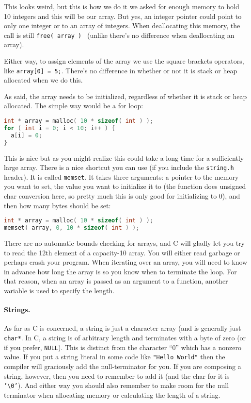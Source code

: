 This looks weird, but this is how we do it we asked for enough memory to hold 10 integers and this will be our array. But yes, an integer pointer could point to only one integer or to an array of integers. When deallocating this memory, the call is still \texttt{free( array ) } (unlike \Cpp there's no difference when deallocating an array).

Either way, to assign elements of the array we use the square brackets operators, like \texttt{array[0] = 5;}. There's no difference in whether or not it is stack or heap allocated when we do this.

As said, the array needs to be initialized, regardless of whether it is stack or heap allocated. The simple way would be a for loop:

\begin{lstlisting}[language=C]
int * array = malloc( 10 * sizeof( int ) );
for ( int i = 0; i < 10; i++ ) {
  a[i] = 0;
}
\end{lstlisting}

This is nice but as you might realize this could take a long time for a sufficiently large array. There is a nice shortcut you can use (if you include the \texttt{string.h} header). It is called \texttt{memset}. It takes three arguments: a pointer to the memory you want to set, the value you want to initialize it to (the function does unsigned char conversion here, so pretty much this is only good for initializing to 0), and then how many bytes should be set:

\begin{lstlisting}[language=C]
int * array = malloc( 10 * sizeof( int ) );
memset( array, 0, 10 * sizeof( int ) );
\end{lstlisting}

There are no automatic bounds checking for arrays, and C will gladly let you try to read the 12th element of a capacity-10 array. You will either read garbage or perhaps crash your program. When iterating over an array, you will need to know in advance how long the array is so you know when to terminate the loop. For that reason, when an array is passed as an argument to a function, another variable is used to specify the length.

\paragraph{Strings.}

As far as C is concerned, a string is just a character array (and is generally just \texttt{char*}. In C, a string is of arbitrary length and terminates with a byte of zero (or if you prefer, \texttt{NULL}). This is distinct from the character ``0'' which has a nonzero value. If you put a string literal in some code like \texttt{"Hello World"} then the compiler will graciously add the null-terminator for you. If you are composing a string, however, then you need to remember to add it (and the char for it is \texttt{'\textbackslash0'}). And either way you should also remember to make room for the null terminator when allocating memory or calculating the length of a string.

